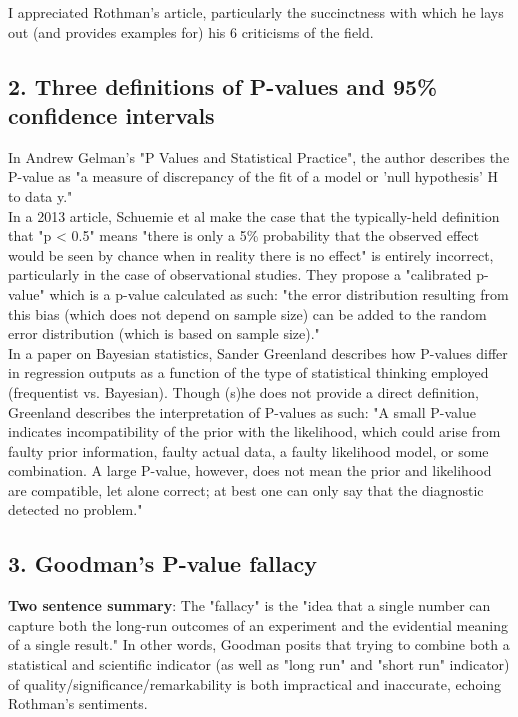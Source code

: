 \documentclass[11pt]{article}
\begin{document}
\begin{multicols}{2}
\noindent I appreciated Rothman's article, particularly the succinctness with which he lays out (and provides examples for) his 6 criticisms of the field.

\newpage
\subsection*{2. Three definitions of P-values and 95\% confidence intervals}
In Andrew Gelman's "P Values and Statistical Practice", the author describes the P-value as "a measure of discrepancy of the fit of a model or 'null hypothesis' H to data y." \cite{Gelman2013} \\

In a 2013 article, Schuemie et al make the case that the typically-held definition that "p < 0.5" means "there is only a 5\% probability that the observed effect would be seen by chance when in reality there is no effect" is entirely incorrect, particularly in the case of observational studies. \cite{Schuemie2013} They propose a "calibrated p-value" which is a p-value calculated as such: "the error distribution resulting from this bias (which does not depend on sample size) can be added to the random error distribution (which is based on sample size)." \\

In a paper on Bayesian statistics, Sander Greenland describes how P-values differ in regression outputs as a function of the type of statistical thinking employed (frequentist vs. Bayesian). \cite{Greenland2007} Though (s)he does not provide a direct definition, Greenland describes the interpretation of P-values as such: "A small P-value indicates incompatibility of the prior with the likelihood, which could arise from faulty prior information, faulty actual data, a faulty likelihood model, or some combination.  A large P-value, however, does not mean the prior and likelihood are compatible, let alone correct; at best one can only say that the diagnostic detected no problem."

\vfill
\columnbreak


\subsection*{3. Goodman's P-value fallacy}
\textbf{Two sentence summary}: The "fallacy" is the "idea that a single number can capture both the long-run outcomes of an experiment and the evidential meaning of a single result." \cite{Goodman1999} In other words, Goodman posits that trying to combine both a statistical and scientific indicator (as well as "long run" and "short run" indicator) of quality/significance/remarkability is both impractical and inaccurate, echoing Rothman's sentiments.\cite{Rothman2014} \\


\end{multicols}
\end{document}
